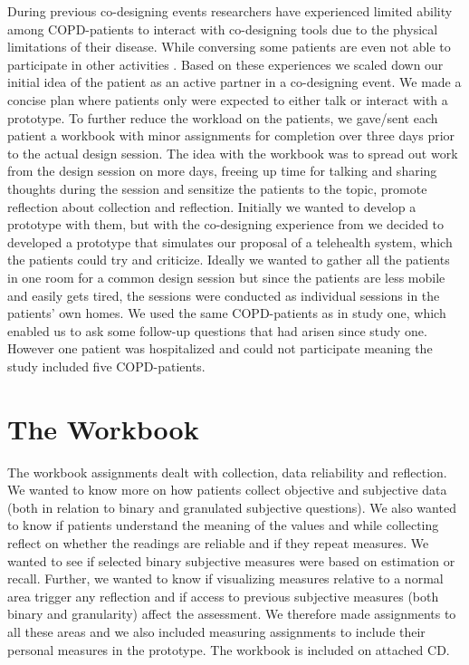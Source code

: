 During previous co-designing events researchers have  experienced limited ability among COPD-patients to interact with co-designing tools due to the physical limitations of their disease. While conversing some patients are even not able to participate in other activities \citep{genTech}. Based on these experiences we scaled down our initial idea of the patient as an active partner in a co-designing event. We made a concise plan where patients only were expected to either talk or interact with a prototype. To further reduce the workload on the patients, we gave/sent each patient a workbook with minor assignments for completion over three days prior to the actual design session. The idea with the workbook was to spread out work from the design session on more days, freeing up time for talking and sharing thoughts during the session and sensitize the patients to the topic, promote reflection about collection and reflection. Initially we wanted to develop a prototype with them, but with the co-designing experience from \citep{genTech} we decided to developed a prototype that simulates our proposal of a telehealth system, which the patients could try and criticize. Ideally we wanted to gather all the patients in one room for a common design session but since the patients are less mobile and easily gets tired, the sessions were conducted as individual sessions in the patients' own homes. We used the same COPD-patients as in study one, which enabled us to ask some follow-up questions that had arisen since study one. However one patient was hospitalized and could not participate meaning the study included five COPD-patients.

\section{The Workbook}

The workbook assignments dealt with collection, data reliability and reflection. We wanted to know more on how patients collect objective and subjective data (both in relation to binary and granulated subjective questions). We also wanted to know if patients understand the meaning of the values and while collecting reflect on whether the readings are reliable and if they repeat measures. We wanted to see if selected binary subjective measures were based on estimation or recall. Further, we wanted to know if visualizing measures relative to a normal area trigger any reflection and if access to previous subjective measures (both  binary and granularity) affect the assessment. We therefore made assignments to all these areas and we also included measuring assignments to include their personal measures in the prototype. The workbook is included on attached CD.


